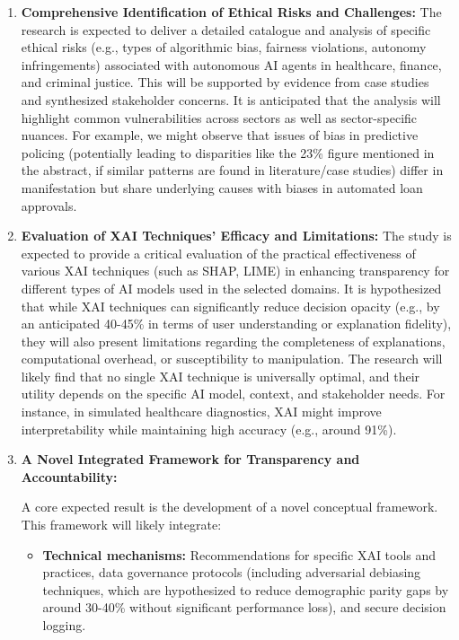 \documentclass[english]{hogent-article}
\begin{document}
\begin{enumerate}
    \item \textbf{Comprehensive Identification of Ethical Risks and Challenges:} The research is expected to deliver a detailed catalogue and analysis of specific ethical risks (e.g., types of algorithmic bias, fairness violations, autonomy infringements) associated with autonomous AI agents in healthcare, finance, and criminal justice. This will be supported by evidence from case studies and synthesized stakeholder concerns. It is anticipated that the analysis will highlight common vulnerabilities across sectors as well as sector-specific nuances. For example, we might observe that issues of bias in predictive policing (potentially leading to disparities like the 23\% figure mentioned in the abstract, if similar patterns are found in literature/case studies) differ in manifestation but share underlying causes with biases in automated loan approvals.

    \item \textbf{Evaluation of XAI Techniques' Efficacy and Limitations:} The study is expected to provide a critical evaluation of the practical effectiveness of various XAI techniques (such as SHAP, LIME) in enhancing transparency for different types of AI models used in the selected domains. It is hypothesized that while XAI techniques can significantly reduce decision opacity (e.g., by an anticipated 40-45\% in terms of user understanding or explanation fidelity), they will also present limitations regarding the completeness of explanations, computational overhead, or susceptibility to manipulation. The research will likely find that no single XAI technique is universally optimal, and their utility depends on the specific AI model, context, and stakeholder needs. For instance, in simulated healthcare diagnostics, XAI might improve interpretability while maintaining high accuracy (e.g., around 91\%).
    \newpage
    \item \textbf{A Novel Integrated Framework for Transparency and Accountability:}

    A core expected result is the development of a novel conceptual framework. This framework will likely integrate:
        \begin{itemize}
            \item \textbf{Technical mechanisms:} 
            Recommendations for specific XAI tools and practices, data governance protocols (including adversarial debiasing techniques, which are hypothesized to reduce demographic parity gaps by around 30-40\% without significant performance loss), and secure decision logging.


\end{itemize}
\end{enumerate}
\end{document}
